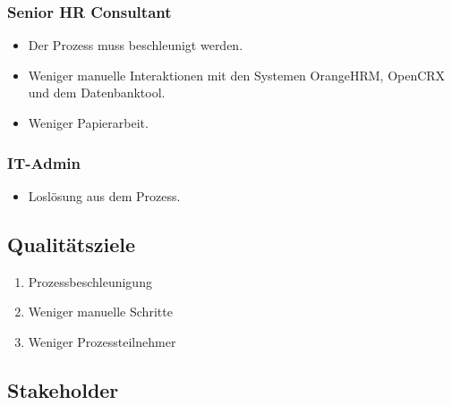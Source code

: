 \documentclass[]{article}
\begin{document}
\subsubsection{Senior HR Consultant}
\begin{itemize}
	\item Der Prozess muss beschleunigt werden.
	\item Weniger manuelle Interaktionen mit den Systemen OrangeHRM, OpenCRX und dem Datenbanktool.
	\item Weniger Papierarbeit.
\end{itemize}

\subsubsection{IT-Admin}
\begin{itemize}
 \item Loslösung aus dem Prozess.
\end{itemize}

\hypertarget{_qualit_tsziele}{%
\subsection{Qualitätsziele}\label{_qualit_tsziele}}

\begin{enumerate}
\item Prozessbeschleunigung
\item Weniger manuelle Schritte
\item Weniger Prozessteilnehmer
\end{enumerate}


\hypertarget{_stakeholder}{%
\subsection{Stakeholder}\label{_stakeholder}}
\end{document}
